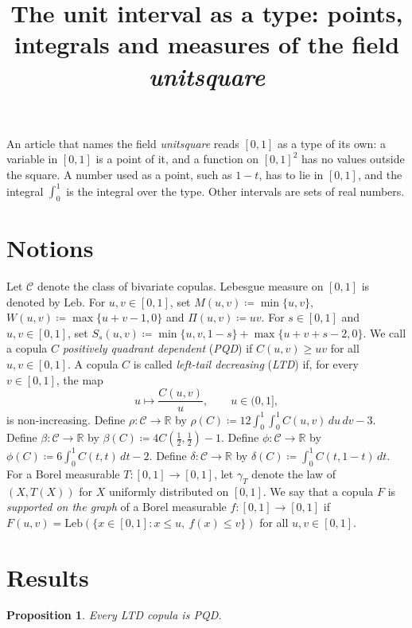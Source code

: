 \documentclass{article}
\title{The unit interval as a type: points, integrals and measures of the field \emph{unitsquare}}
\newtheorem{proposition}{Proposition}
\newcommand{\CC}{\mathcal{C}}
\begin{document}
\maketitle

An article that names the field \emph{unitsquare} reads $[0,1]$ as a type of its own: a variable in $[0,1]$ is a point of it, and a function on $[0,1]^2$ has no values outside the square.
A number used as a point, such as $1-t$, has to lie in $[0,1]$, and the integral $\int_0^1$ is the integral over the type.
Other intervals are sets of real numbers.

\section{Notions}

Let $\CC$ denote the class of bivariate copulas.
Lebesgue measure on $[0,1]$ is denoted by $\mathrm{Leb}$.
For $u,v\in[0,1]$, set $M(u,v)\coloneqq\min\{u,v\}$, $W(u,v)\coloneqq\max\{u+v-1,0\}$ and $\Pi(u,v)\coloneqq uv$.
For $s\in[0,1]$ and $u,v\in[0,1]$, set $S_s(u,v)\coloneqq\min\{u,v,1-s\}+\max\{u+v+s-2,0\}$.
We call a copula $C$ \emph{positively quadrant dependent} (\emph{PQD}) if $C(u,v)\ge uv$ for all $u,v\in[0,1]$.
A copula $C$ is called \emph{left-tail decreasing} (\emph{LTD}) if, for every $v\in[0,1]$, the map
\begin{equation}\label{eq:ltd}
u\longmapsto\frac{C(u,v)}{u},\qquad u\in(0,1],
\end{equation}
is non-increasing.
Define $\rho:\CC\to\mathbb{R}$ by $\rho(C)\coloneqq 12\int_0^1\int_0^1 C(u,v)\,du\,dv-3$.
Define $\beta:\CC\to\mathbb{R}$ by $\beta(C)\coloneqq 4C(\frac12,\frac12)-1$.
Define $\phi:\CC\to\mathbb{R}$ by $\phi(C)\coloneqq 6\int_0^1 C(t,t)\,dt-2$.
Define $\delta:\CC\to\mathbb{R}$ by $\delta(C)\coloneqq \int_0^1 C(t,1-t)\,dt$.
For a Borel measurable $T:[0,1]\to[0,1]$, let $\gamma_T$ denote the law of $(X,T(X))$ for $X$ uniformly distributed on $[0,1]$.
We say that a copula $F$ is \emph{supported on the graph} of a Borel measurable $f:[0,1]\to[0,1]$ if $F(u,v)=\mathrm{Leb}(\{x\in[0,1] : x\le u,\ f(x)\le v\})$ for all $u,v\in[0,1]$.

\section{Results}

\begin{proposition}\label{p1}
Every LTD copula is PQD.
\end{proposition}
\end{document}
